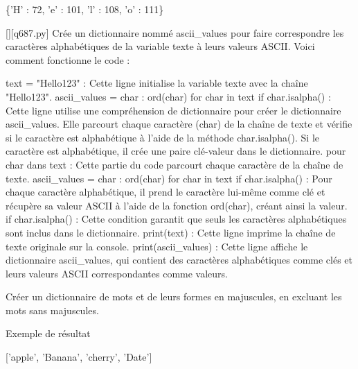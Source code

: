 \{'H' : 72, 'e' : 101, 'l' : 108, 'o' : 111\}
        \par
        \begin{solution}
            \renewcommand{\nomfichier}{q687.py}
            \pythonfile{\chemincode \nomfichier}[][\nomfichier]
            Crée un dictionnaire nommé ascii_values pour faire correspondre les caractères alphabétiques de la variable texte à leurs valeurs ASCII. Voici comment fonctionne le code :

    text = "Hello123" : Cette ligne initialise la variable texte avec la chaîne "Hello123".
    ascii_values = {char : ord(char) for char in text if char.isalpha()} : Cette ligne utilise une compréhension de dictionnaire pour créer le dictionnaire ascii_values. Elle parcourt chaque caractère (char) de la chaîne de texte et vérifie si le caractère est alphabétique à l'aide de la méthode char.isalpha(). Si le caractère est alphabétique, il crée une paire clé-valeur dans le dictionnaire.
        pour char dans text : Cette partie du code parcourt chaque caractère de la chaîne de texte.
        ascii_values = {char : ord(char) for char in text if char.isalpha()} : Pour chaque caractère alphabétique, il prend le caractère lui-même comme clé et récupère sa valeur ASCII à l'aide de la fonction ord(char), créant ainsi la valeur.
        if char.isalpha() : Cette condition garantit que seuls les caractères alphabétiques sont inclus dans le dictionnaire.
    print(text) : Cette ligne imprime la chaîne de texte originale sur la console.
    print(ascii_values) : Cette ligne affiche le dictionnaire ascii_values, qui contient des caractères alphabétiques comme clés et leurs valeurs ASCII correspondantes comme valeurs.
        \end{solution}
        

        \question
        Créer un dictionnaire de mots et de leurs formes en majuscules, en excluant les mots sans majuscules.

Exemple de résultat

['apple', 'Banana', 'cherry', 'Date']

